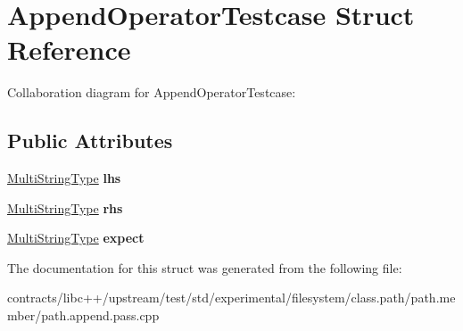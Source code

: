 \hypertarget{struct_append_operator_testcase}{}\section{Append\+Operator\+Testcase Struct Reference}
\label{struct_append_operator_testcase}


Collaboration diagram for Append\+Operator\+Testcase\+:
\subsection*{Public Attributes}
\begin{DoxyCompactItemize}
\item 
\mbox{\label{struct_append_operator_testcase_a8896ca377fe95b5fd662de887db198b7}} 
\mbox{\hyperlink{struct_multi_string_type}{Multi\+String\+Type}} {\bfseries lhs}
\item 
\mbox{\label{struct_append_operator_testcase_ae75f9d2246d3ad09ee6f2e8cfb389765}} 
\mbox{\hyperlink{struct_multi_string_type}{Multi\+String\+Type}} {\bfseries rhs}
\item 
\mbox{\label{struct_append_operator_testcase_a15bfb0062d6a18a045f20f11de41421d}} 
\mbox{\hyperlink{struct_multi_string_type}{Multi\+String\+Type}} {\bfseries expect}
\end{DoxyCompactItemize}


The documentation for this struct was generated from the following file\+:\begin{DoxyCompactItemize}
\item 
contracts/libc++/upstream/test/std/experimental/filesystem/class.\+path/path.\+member/path.\+append.\+pass.\+cpp\end{DoxyCompactItemize}
